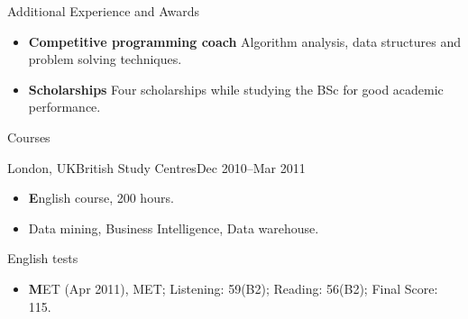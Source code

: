 \documentclass[]{mcdowellcv}
\begin{document}
	\begin{cvsection}{Additional Experience and Awards}
		\begin{cvsubsection}{}{}{}	
			\begin{itemize}
				\item \textbf{Competitive programming coach} Algorithm analysis, data structures and problem solving techniques.
				\item \textbf{Scholarships} Four scholarships while studying the BSc for good academic performance.
			\end{itemize}
		\end{cvsubsection}
	\end{cvsection}

	\begin{cvsection}{Courses}
		\begin{cvsubsection}{London,	UK}{British Study Centres}{Dec 2010--Mar 2011}	
			\begin{itemize}
				\item \textbf English course, 200 hours. 
				\item Data mining, Business Intelligence, Data warehouse.
			\end{itemize}
		\end{cvsubsection}
	\end{cvsection}	
	
	\begin{cvsection}{English	tests}
		\begin{cvsubsection}{}{}{}	
			\begin{itemize}
				\item \textbf MET (Apr 2011), MET; Listening: 59(B2); Reading: 56(B2); Final	Score: 115. 
			\end{itemize}
		\end{cvsubsection}
	\end{cvsection}	

	
\end{document}
